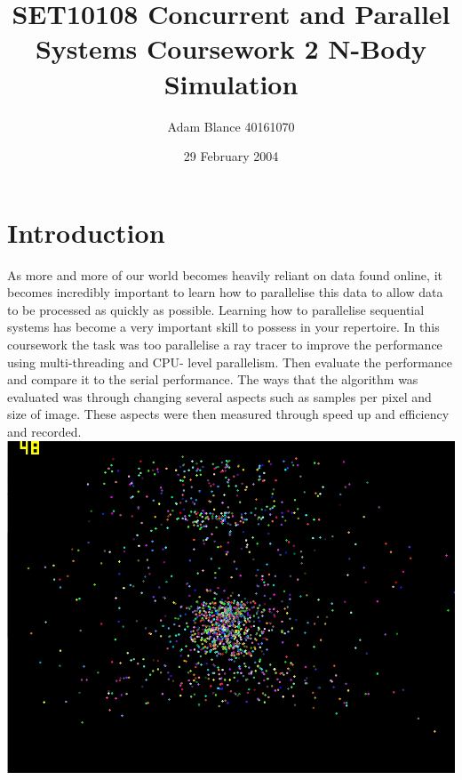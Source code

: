 \documentclass[12pt]{article}
\author{Adam Blance 40161070}
\date{29 February 2004}
\begin{document}
	\title{SET10108 Concurrent and Parallel Systems \linebreak Coursework 2 \linebreak N-Body Simulation}
	
	\maketitle
\begin{abstract}
			
\end{abstract}
	
\section{Introduction}
As more and more of our world becomes heavily reliant on data found online, it becomes incredibly important to learn how to parallelise this data to allow data to be processed as quickly as possible.  Learning how to parallelise sequential systems has become a very important skill to possess in your repertoire. 
\newline 
In this coursework the task was too parallelise a ray tracer to improve the performance using multi-threading and CPU- level parallelism. Then evaluate the performance and compare it to the serial performance.  The ways that the algorithm was evaluated was through changing several aspects such as samples per pixel and size of image. These aspects were then measured through speed up and efficiency and recorded.
\newline
\includegraphics[scale=0.5]{pics/intro.png}
\end{document}
